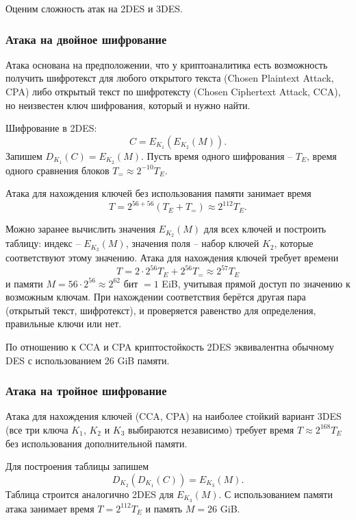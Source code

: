 Оценим сложность атак на 2DES и 3DES.

\subsubsection{Атака на двойное шифрование}


Атака основана на предположении, что у криптоаналитика есть возможность получить шифротекст для любого открытого текста (Chosen Plaintext Attack, CPA) либо открытый текст по шифротексту (Chosen Ciphertext Attack, CCA), но неизвестен ключ шифрования, который и нужно найти.

Шифрование в 2DES:
    \[ C = E_{K_1}( E_{K_2}(M)). \]
Запишем $D_{K_1}(C) = E_{K_2}(M)$. Пусть время одного шифрования -- $T_E$, время одного сравнения блоков $T_{=} \approx 2^{-10} T_E$.

Атака для нахождения ключей без использования памяти занимает время
    \[ T = 2^{56 + 56} (T_E + T_{=}) \approx 2^{112} T_E. \]

Можно заранее вычислить значения $E_{K_2}(M)$ для всех ключей и построить таблицу: индекс -- $E_{K_2}(M)$, значения поля -- набор ключей $K_2$, которые соответствуют этому значению. Атака для нахождения ключей требует времени
    \[ T = 2 \cdot 2^{56} T_E + 2^{56} T_{=} \approx 2^{57} T_E \]
и памяти $M = 56 \cdot 2^{56} \approx 2^{62}$ бит $= 1$ EiB, учитывая прямой доступ по значению к возможным ключам. При нахождении соответствия берётся другая пара (открытый текст, шифротекст), и проверяется равенство для определения, правильные ключи или нет.

По отношению к CCA и CPA криптостойкость 2DES эквивалентна обычному DES с использованием 26 GiB памяти.

\subsubsection{Атака на тройное шифрование}

Атака для нахождения ключей (CCA, CPA) на наиболее стойкий вариант 3DES (все три ключа $K_1$, $K_2$ и $K_3$ выбираются независимо) требует время $T \approx 2^{168} T_E$ без использования дополнительной памяти.

Для построения таблицы запишем
    \[ D_{K_2}( D_{K_1}( C)) = E_{K_3} (M). \]
Таблица строится аналогично 2DES для $E_{K_3}(M)$. С использованием памяти атака занимает время $T = 2^{112} T_E$ и память $M = 26$ GiB.
